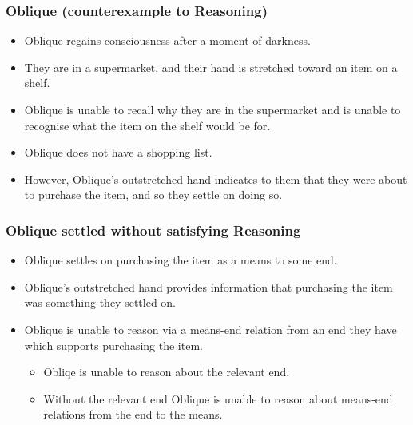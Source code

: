 \documentclass[noamssymb,
graphics,
]{beamer} %
\newcommand{\schemaName}[1]{\textsf{#1}}
\begin{document}
\begin{frame}
  \frametitle{Oblique (counterexample to \schemaName{Reasoning})}

  {\rmfamily
    \begin{itemize}
      \item Oblique regains consciousness after a moment of darkness.%
      \item They are in a supermarket, and their hand is stretched toward an item on a shelf.%
      \item Oblique is unable to recall why they are in the supermarket and is unable to recognise what the item on the shelf would be for.%
      \item Oblique does not have a shopping list.%
      \item However, Oblique's outstretched hand indicates to them that they were about to purchase the item, and so they settle on doing so.
      \end{itemize}
  }
\end{frame}

\begin{frame}
  \frametitle{Oblique settled without satisfying \schemaName{Reasoning}}

  \begin{itemize}
  \item Oblique settles on purchasing the item as a means to some end.
  \item Oblique's outstretched hand provides information that purchasing the item was something they settled on.
  \item Oblique is unable to reason via a means-end relation from an end they have which supports purchasing the item.
    \begin{itemize}
    \item Obliqe is unable to reason about the relevant end.
    \item Without the relevant end Oblique is unable to reason about means-end relations from the end to the means.
    \end{itemize}
  \end{itemize}

\end{frame}
\end{document}
